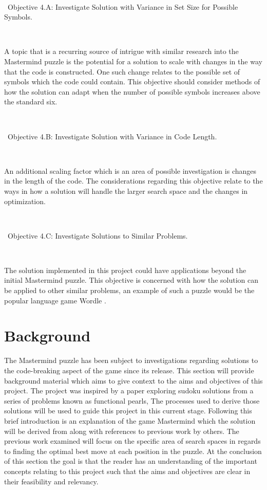 \documentclass[12pt]{article}  %
\theoremstyle{definition}
\theoremstyle{remark}
\begin{document}
\

\textbullet\ Objective 4.A: Investigate Solution with Variance in Set Size for Possible Symbols.

\

A topic that is a recurring source of intrigue with similar research into the Mastermind puzzle is the potential for a solution to scale with
changes in the way that the code is constructed. One such change relates to the possible set of symbols which the code could contain.
This objective should consider methods of how the solution can adapt when the number of possible symbols increases above the standard six.

\

\textbullet\ Objective 4.B: Investigate Solution with Variance in Code Length.

\

An additional scaling factor which is an area of possible investigation is changes in the length of the code. 
The considerations regarding this objective relate to the ways in how a solution will handle the larger search space and the changes in optimization.

\

\textbullet\ Objective 4.C: Investigate Solutions to Similar Problems.

\

The solution implemented in this project could have applications beyond the initial  Mastermind puzzle. 
This objective is concerned with how the solution can be applied to other similar problems, an example of such a puzzle would be the popular language game Wordle \cite{Wordle}.

%

\newpage                     %
\section{Background}\label{ss:back}

The Mastermind puzzle has been subject to investigations regarding solutions to the code-breaking aspect of the game
since its release.
This section will provide background material which aims to give context to the aims and objectives of this project.
The project was inspired by a paper exploring sudoku solutions from a series of problems known as functional pearls,
The processes used to derive those solutions will be used to guide this project in this current stage.
Following this brief introduction is an explanation of the game Mastermind which the solution will be derived from along
with references to previous work by others. The previous work examined will focus on the specific area of search spaces
in regards to finding the optimal best move at each position in the puzzle. At the conclusion of this section the goal is
that the reader has an understanding of the important concepts relating to this project such that the aims and objectives
are clear in their feasibility and relevancy.
\end{document}
